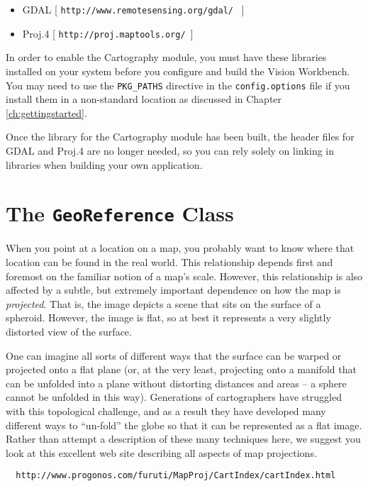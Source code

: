\begin{itemize}
\item GDAL   [ {\tt http://www.remotesensing.org/gdal/ } ]
\item Proj.4 [ {\tt http://proj.maptools.org/ }]
\end{itemize}

In order to enable the Cartography module, you must have these
libraries installed on your system before you configure and build the
Vision Workbench.  You may need to use the \verb#PKG_PATHS# directive
in the \verb#config.options# file if you install them in a
non-standard location as discussed in Chapter \ref{ch:gettingstarted}.

Once the library for the Cartography module has been built, the header
files for GDAL and Proj.4 are no longer needed, so you can rely solely
on linking in libraries when building your own application.

\section{The {\tt GeoReference} Class}

When you point at a location on a map, you probably want to know where
that location can be found in the real world.  This relationship
depends first and foremost on the familiar notion of a map's scale.
However, this relationship is also affected by a subtle, but extremely
important dependence on how the map is {\em projected}.  That is, the
image depicts a scene that sits on the surface of a spheroid.
However, the image is flat, so at best it represents a very slightly
distorted view of the surface.  

One can imagine all sorts of different ways that the surface can be
warped or projected onto a flat plane (or, at the very least,
projecting onto a manifold that can be unfolded into a plane without
distorting distances and areas -- a sphere cannot be unfolded in this
way).  Generations of cartographers have struggled with this
topological challenge, and as a result they have developed many
different ways to ``un-fold'' the globe so that it can be represented
as a flat image.  Rather than attempt a description of these many
techniques here, we suggest you look at this excellent web site
describing all aspects of map projections.

\begin{verbatim}
  http://www.progonos.com/furuti/MapProj/CartIndex/cartIndex.html
\end{verbatim}

